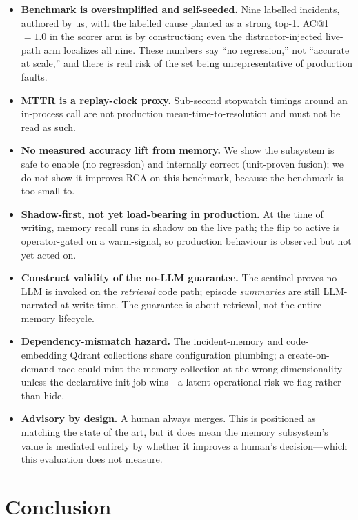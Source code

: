 \documentclass[11pt]{article}
\begin{document}
\begin{itemize}
  \item \textbf{Benchmark is oversimplified and self-seeded.} Nine labelled
    incidents, authored by us, with the labelled cause planted as a strong top-1.
    AC@1 $= 1.0$ in the scorer arm is by construction; even the distractor-injected
    live-path arm localizes all nine. These numbers say ``no regression,'' not
    ``accurate at scale,'' and there is real risk of the set being unrepresentative
    of production faults.
  \item \textbf{MTTR is a replay-clock proxy.} Sub-second stopwatch timings around
    an in-process call are not production mean-time-to-resolution and must not be
    read as such.
  \item \textbf{No measured accuracy lift from memory.} We show the subsystem is
    safe to enable (no regression) and internally correct (unit-proven fusion); we
    do not show it improves RCA on this benchmark, because the benchmark is too
    small to.
  \item \textbf{Shadow-first, not yet load-bearing in production.} At the time of
    writing, memory recall runs in shadow on the live path; the flip to active is
    operator-gated on a warm-signal, so production behaviour is observed but not
    yet acted on.
  \item \textbf{Construct validity of the no-LLM guarantee.} The sentinel proves
    no LLM is invoked on the \emph{retrieval} code path; episode \emph{summaries}
    are still LLM-narrated at write time. The guarantee is about retrieval, not the
    entire memory lifecycle.
  \item \textbf{Dependency-mismatch hazard.} The incident-memory and
    code-embedding Qdrant collections share configuration plumbing; a
    create-on-demand race could mint the memory collection at the wrong
    dimensionality unless the declarative init job wins---a latent operational risk
    we flag rather than hide.
  \item \textbf{Advisory by design.} A human always merges. This is positioned as
    matching the state of the art, but it does mean the memory subsystem's value is
    mediated entirely by whether it improves a human's decision---which this
    evaluation does not measure.
\end{itemize}

\section{Conclusion}
\end{document}
